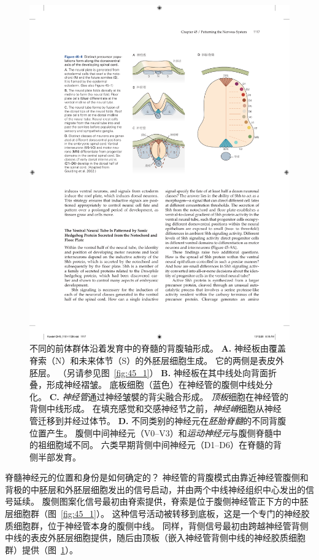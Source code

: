\begin{figure}[htbp]
	\centering
	\includegraphics[width=0.86\linewidth]{chap45/fig_45_8}
	\caption{不同的前体群体沿着发育中的脊髓的背腹轴形成。
		\textbf{A.} 神经板由覆盖脊索（N）和未来体节（S）的外胚层细胞生成。
		它的两侧是表皮外胚层。 （另请参见图~\ref{fig:45_1}） 
		\textbf{B.} 神经板在其中线处向背面折叠，形成神经褶皱。
		底板细胞（蓝色）在神经管的腹侧中线处分化。
		\textbf{C.} \textit{神经管}通过神经皱襞的背尖融合形成。
		\textit{顶板}细胞在神经管的背侧中线形成。
		在填充感觉和交感神经节之前，\textit{神经嵴}细胞从神经管迁移到并经过体节。
		\textbf{D.} 不同类别的神经元在\textit{胚胎脊髓}的不同背腹位置产生。
		腹侧中间神经元（V0–V3）和\textit{运动神经元}与腹侧脊髓中的祖细胞域不同。
		六类早期背侧中间神经元（D1–D6）在脊髓的背侧半部发育\cite{goulding2002formation}。}
	\label{fig:45_8}
\end{figure}


脊髓神经元的位置和身份是如何确定的？
神经管的背腹模式由靠近神经管腹侧和背极的中胚层和外胚层细胞发出的信号启动，并由两个中线神经组织中心发出的信号延续。
腹侧图案化信号最初由脊索提供，脊索是位于腹侧神经管正下方的中胚层细胞群（图~\ref{fig:45_1}）。
这种信号活动被转移到底板，这是一个专门的神经胶质细胞群，位于神经管本身的腹侧中线。
同样，背侧信号最初由跨越神经管背侧中线的表皮外胚层细胞提供，随后由顶板（嵌入神经管背侧中线的神经胶质细胞群）提供（图~\ref{fig:45_8}）。


